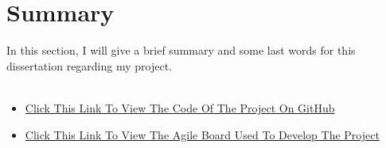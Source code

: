 \section{Summary}

In this section, I will give a brief summary and some last words for this dissertation regarding my project.\\ \\

\begin{appendices}
\begin{itemize}
\item \href{https://github.com/Emmanuel-Osabuehien/AppliedProjectMinorDissertation}{Click This Link To View The Code Of The Project On GitHub}
\item \href{https://g00373559.atlassian.net/jira/software/projects/MPRO/boards/4}{Click This Link To View The Agile Board Used To Develop The Project}
\end{itemize}
\end{appendices}